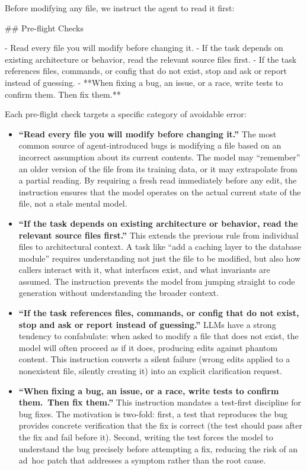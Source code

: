 \documentclass{article}
\begin{document}
Before modifying any file, we instruct the agent to read it first:

\begin{prompt}
## Pre-flight Checks

- Read every file you will modify before changing it.
- If the task depends on existing architecture or behavior,
  read the relevant source files first.
- If the task references files, commands, or config that do
  not exist, stop and ask or report instead of guessing.
- **When fixing a bug, an issue, or a race, write tests to
  confirm them. Then fix them.**
\end{prompt}

\noindent Each pre-flight check targets a specific category of avoidable
error:

\begin{itemize}[nosep]
\item \textbf{``Read every file you will modify before changing it.''}
  The most common source of agent-introduced bugs is modifying a file
  based on an incorrect assumption about its current contents.  The
  model may ``remember'' an older version of the file from its
  training data, or it may extrapolate from a partial reading.  By
  requiring a fresh read immediately before any edit, the instruction
  ensures that the model operates on the actual current state of the
  file, not a stale mental model.

\item \textbf{``If the task depends on existing architecture or
  behavior, read the relevant source files first.''}  This extends the
  previous rule from individual files to architectural context.  A
  task like ``add a caching layer to the database module'' requires
  understanding not just the file to be modified, but also how callers
  interact with it, what interfaces exist, and what invariants are
  assumed.  The instruction prevents the model from jumping straight
  to code generation without understanding the broader context.

\item \textbf{``If the task references files, commands, or config that
  do not exist, stop and ask or report instead of guessing.''}  LLMs
  have a strong tendency to confabulate: when asked to modify a file
  that does not exist, the model will often proceed as if it does,
  producing edits against phantom content.  This instruction converts
  a silent failure (wrong edits applied to a nonexistent file,
  silently creating it) into an explicit clarification request.

\item \textbf{``When fixing a bug, an issue, or a race, write tests
  to confirm them.\ Then fix them.''}  This instruction mandates a
  test-first discipline for bug fixes.  The motivation is two-fold:
  first, a test that reproduces the bug provides concrete verification
  that the fix is correct (the test should pass after the fix and fail
  before it).  Second, writing the test forces the model to understand
  the bug precisely before attempting a fix, reducing the risk of an
  ad~hoc patch that addresses a symptom rather than the root cause.
\end{itemize}
\end{document}
